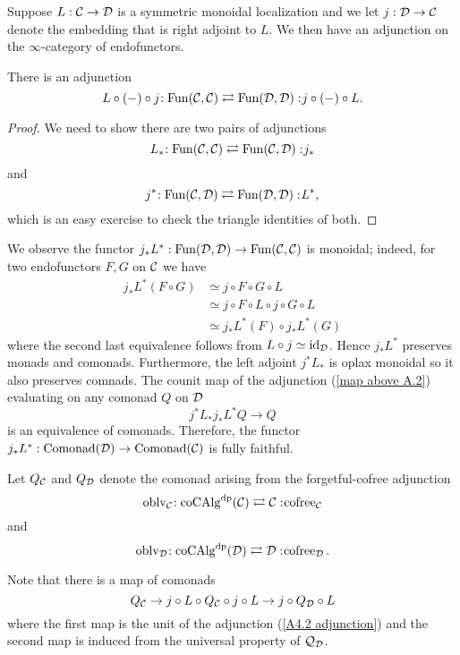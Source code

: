 Suppose $L:{\mathcal{C}} \to {\mathcal{D}}$ is a symmetric monoidal localization
and we let $j:{\mathcal{D}} \to {\mathcal{C}}$ denote the embedding that is right adjoint to $L$.
We then have an adjunction on the $\infty$-category of endofunctors.
\begin{proposition}
\label{Prop A.4.2}
There is an adjunction
\begin{equation}
\label{A4.2 adjunction}
    L\circ (-)\circ j\negmedspace: \operatorname{Fun}({\mathcal{C}}, {\mathcal{C}})\rightleftarrows \operatorname{Fun}({\mathcal{D}}, {\mathcal{D}}):\negmedspace j\circ (-)\circ L.
\end{equation}
\end{proposition}
\begin{proof}
    We need to show there are two pairs of adjunctions
    $$
    L_{*}\negmedspace: \operatorname{Fun}({\mathcal{C}}, {\mathcal{C}})\rightleftarrows \operatorname{Fun}({\mathcal{C}}, {\mathcal{D}}):\negmedspace j_*
    $$
    and
    $$
    j^{*}\negmedspace: \operatorname{Fun}({\mathcal{C}}, {\mathcal{D}})\rightleftarrows \operatorname{Fun}({\mathcal{D}}, {\mathcal{D}}):\negmedspace L^*,
    $$
    which is an easy exercise to check the triangle identities of both.
\end{proof}


We observe the functor $j_*L^*: \operatorname{Fun}({\mathcal{D}},{\mathcal{D}}) \to \operatorname{Fun}({\mathcal{C}},{\mathcal{C}})$ is monoidal; indeed, for two endofunctors $F,G$ on ${\mathcal{C}}$ we have
\begin{align*}
    j_*L^*(F\circ G) & \simeq j\circ F \circ G \circ L\\
                     & \simeq j\circ F \circ L \circ j \circ  G \circ L \\
                     & \simeq j_*L^*(F)\circ j_*L^*(G)
\end{align*}
where the second last equivalence follows from $ L \circ j \simeq \operatorname{id}_{{\mathcal{D}}}$.
Hence $j_*L^*$ preserves monads and comonads. Furthermore, the left adjoint $j^*L_*$ is oplax monoidal so it also preserves comnads. 
The counit map of the adjunction (\ref{map above A.2})  evaluating on any comonad $Q$ on ${\mathcal{D}}$
\begin{equation}
\label{map above A.2}
    j^*L_*j_*L^*Q  \to  Q
\end{equation}
is an equivalence of comonads. Therefore, the functor $j_*L^*:\operatorname{Comonad}({\mathcal{D}}) \to \operatorname{Comonad}({\mathcal{C}})$ is fully faithful.

Let $Q_{{\mathcal{C}}}$ and $Q_{{\mathcal{D}}}$ denote the comonad arising from the forgetful-cofree adjunction 
$$\operatorname{oblv}_{{\mathcal{C}}}\negmedspace: \operatorname{coCAlg}^{\operatorname{dp}}({\mathcal{C}})\rightleftarrows {\mathcal{C}}:\negmedspace \operatorname{cofree}_{{\mathcal{C}}}$$
and
$$
\operatorname{oblv}_{{\mathcal{D}}}\negmedspace: \operatorname{coCAlg}^{\operatorname{dp}}({\mathcal{D}})\rightleftarrows {\mathcal{D}}:\negmedspace \operatorname{cofree}_{{\mathcal{D}}}.
$$

Note that there is a map of comonads 
\begin{equation}
\label{A.3}
    Q_{{\mathcal{C}}} \to 
   j\circ L \circ Q_{{\mathcal{C}}} \circ j\circ L
    \to 
    j\circ Q_{{\mathcal{D}}} \circ L
\end{equation}
where the first map is the unit of the adjunction (\ref{A4.2 adjunction}) and the second map is induced from the universal property of ${\mathcal{Q}}_{\mathcal{D}}$.

